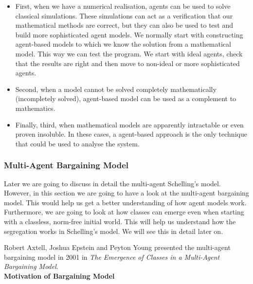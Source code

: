 \documentclass[../main.tex]{subfiles}
\begin{document}
\begin{itemize}
    \item First, when we have a numerical realisation, agents can be used to solve classical simulations. These simulations can act as a verification that our mathematical methods are correct, but they can also be used to test and build more sophisticated agent models. We normally start with constructing agent-based models to which we know the solution from a mathematical model. This way we can test the program. We start with ideal agents, check that the results are right and then move to non-ideal or more sophisticated agents. 
    \item Second, when a model cannot be solved completely mathematically (incompletely solved), agent-based model can be used as a complement to mathematics.
    \item Finally, third, when mathematical models are apparently intractable or even proven insoluble. In these cases, a agent-based approach is the only technique that could be used to analyse the system.
\end{itemize}

\subsubsection{Multi-Agent Bargaining Model}
Later we are going to discuss in detail the multi-agent Schelling’s model. However, in this section we are going to have a look at the multi-agent bargaining model. This would help us get a better understanding of how agent models work. Furthermore, we are going to look at how classes can emerge even when starting with a classless, norm-free initial world. This will help us understand how the segregation works in Schelling’s model. We will see this in detail later on.

Robert Axtell, Joshua Epstein and Peyton Young presented the multi-agent bargaining model in 2001 in \textit{The Emergence of Classes in a Multi-Agent Bargaining Model}. \cite[]{Multi-AgentBargainingModel} \\

\textbf{Motivation of Bargaining Model}
\end{document}
